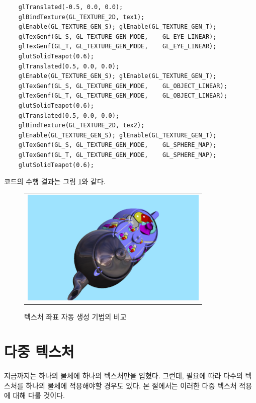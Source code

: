 \begin{algorithmbis}\label{code:OGL_texture:autoMappings}
\lstset{language=C++} 
\begin{lstlisting}
	glTranslated(-0.5, 0.0, 0.0);
	glBindTexture(GL_TEXTURE_2D, tex1);
	glEnable(GL_TEXTURE_GEN_S); glEnable(GL_TEXTURE_GEN_T);
	glTexGenf(GL_S, GL_TEXTURE_GEN_MODE, 	GL_EYE_LINEAR);
	glTexGenf(GL_T, GL_TEXTURE_GEN_MODE, 	GL_EYE_LINEAR);
	glutSolidTeapot(0.6);
	glTranslated(0.5, 0.0, 0.0);
	glEnable(GL_TEXTURE_GEN_S); glEnable(GL_TEXTURE_GEN_T);
	glTexGenf(GL_S, GL_TEXTURE_GEN_MODE, 	GL_OBJECT_LINEAR);
	glTexGenf(GL_T, GL_TEXTURE_GEN_MODE,	GL_OBJECT_LINEAR);
	glutSolidTeapot(0.6);
	glTranslated(0.5, 0.0, 0.0);
	glBindTexture(GL_TEXTURE_2D, tex2);
	glEnable(GL_TEXTURE_GEN_S); glEnable(GL_TEXTURE_GEN_T);
	glTexGenf(GL_S, GL_TEXTURE_GEN_MODE,	GL_SPHERE_MAP);
	glTexGenf(GL_T, GL_TEXTURE_GEN_MODE, 	GL_SPHERE_MAP);
	glutSolidTeapot(0.6);
\end{lstlisting}
\end{algorithmbis}

코드의 수행 결과는 그림 \ref{fig:OGL_texture:mappingComparison}와 같다.
\begin{figure}[h!]
  \centering
	\begin{tabular}{c}
	\includegraphics[width=9cm]{OGL_texture/mappingComparison2.png} 
	\end{tabular}
    \caption{텍스처 좌표 자동 생성 기법의 비교}
    \label{fig:OGL_texture:mappingComparison}
\end{figure}

\section{다중 텍스처}

지금까지는 하나의 물체에 하나의 텍스처만을 입혔다. 그런데, 필요에 따라 다수의 텍스처를 하나의 물체에 적용해야할 경우도 있다. 본 절에서는 이러한 다중 텍스처 적용에 대해 다룰 것이다.

